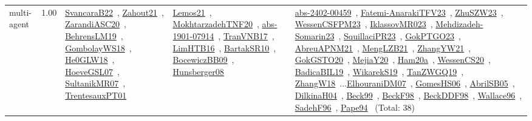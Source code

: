 {\begin{longtable}{p{3cm}r>{\raggedright\arraybackslash}p{6cm}>{\raggedright\arraybackslash}p{6cm}>{\raggedright\arraybackslash}p{8cm}}
\index{multi-agent}\index{Concepts!multi-agent}multi-agent &  1.00 & \href{../works/SvancaraB22.pdf}{SvancaraB22}~\cite{SvancaraB22}, \href{../works/Zahout21.pdf}{Zahout21}~\cite{Zahout21}, \href{../works/ZarandiASC20.pdf}{ZarandiASC20}~\cite{ZarandiASC20}, \href{../works/BehrensLM19.pdf}{BehrensLM19}~\cite{BehrensLM19}, \href{../works/GombolayWS18.pdf}{GombolayWS18}~\cite{GombolayWS18}, \href{../works/He0GLW18.pdf}{He0GLW18}~\cite{He0GLW18}, \href{../works/HoeveGSL07.pdf}{HoeveGSL07}~\cite{HoeveGSL07}, \href{../works/SultanikMR07.pdf}{SultanikMR07}~\cite{SultanikMR07}, \href{../works/TrentesauxPT01.pdf}{TrentesauxPT01}~\cite{TrentesauxPT01} & \href{../works/Lemos21.pdf}{Lemos21}~\cite{Lemos21}, \href{../works/MokhtarzadehTNF20.pdf}{MokhtarzadehTNF20}~\cite{MokhtarzadehTNF20}, \href{../works/abs-1901-07914.pdf}{abs-1901-07914}~\cite{abs-1901-07914}, \href{../works/TranVNB17.pdf}{TranVNB17}~\cite{TranVNB17}, \href{../works/LimHTB16.pdf}{LimHTB16}~\cite{LimHTB16}, \href{../works/BartakSR10.pdf}{BartakSR10}~\cite{BartakSR10}, \href{../works/BocewiczBB09.pdf}{BocewiczBB09}~\cite{BocewiczBB09}, \href{../works/Hunsberger08.pdf}{Hunsberger08}~\cite{Hunsberger08} & \href{../works/abs-2402-00459.pdf}{abs-2402-00459}~\cite{abs-2402-00459}, \href{../works/Fatemi-AnarakiTFV23.pdf}{Fatemi-AnarakiTFV23}~\cite{Fatemi-AnarakiTFV23}, \href{../works/ZhuSZW23.pdf}{ZhuSZW23}~\cite{ZhuSZW23}, \href{../works/WessenCSFPM23.pdf}{WessenCSFPM23}~\cite{WessenCSFPM23}, \href{../works/IklassovMR023.pdf}{IklassovMR023}~\cite{IklassovMR023}, \href{../works/Mehdizadeh-Somarin23.pdf}{Mehdizadeh-Somarin23}~\cite{Mehdizadeh-Somarin23}, \href{../works/SquillaciPR23.pdf}{SquillaciPR23}~\cite{SquillaciPR23}, \href{../works/GokPTGO23.pdf}{GokPTGO23}~\cite{GokPTGO23}, \href{../works/AbreuAPNM21.pdf}{AbreuAPNM21}~\cite{AbreuAPNM21}, \href{../works/MengLZB21.pdf}{MengLZB21}~\cite{MengLZB21}, \href{../works/ZhangYW21.pdf}{ZhangYW21}~\cite{ZhangYW21}, \href{../works/GokGSTO20.pdf}{GokGSTO20}~\cite{GokGSTO20}, \href{../works/MejiaY20.pdf}{MejiaY20}~\cite{MejiaY20}, \href{../works/Ham20a.pdf}{Ham20a}~\cite{Ham20a}, \href{../works/WessenCS20.pdf}{WessenCS20}~\cite{WessenCS20}, \href{../works/BadicaBIL19.pdf}{BadicaBIL19}~\cite{BadicaBIL19}, \href{../works/WikarekS19.pdf}{WikarekS19}~\cite{WikarekS19}, \href{../works/TanZWGQ19.pdf}{TanZWGQ19}~\cite{TanZWGQ19}, \href{../works/ZhangW18.pdf}{ZhangW18}~\cite{ZhangW18}...\href{../works/ElhouraniDM07.pdf}{ElhouraniDM07}~\cite{ElhouraniDM07}, \href{../works/GomesHS06.pdf}{GomesHS06}~\cite{GomesHS06}, \href{../works/AbrilSB05.pdf}{AbrilSB05}~\cite{AbrilSB05}, \href{../works/DilkinaH04.pdf}{DilkinaH04}~\cite{DilkinaH04}, \href{../works/Beck99.pdf}{Beck99}~\cite{Beck99}, \href{../works/BeckF98.pdf}{BeckF98}~\cite{BeckF98}, \href{../works/BeckDDF98.pdf}{BeckDDF98}~\cite{BeckDDF98}, \href{../works/Wallace96.pdf}{Wallace96}~\cite{Wallace96}, \href{../works/SadehF96.pdf}{SadehF96}~\cite{SadehF96}, \href{../works/Pape94.pdf}{Pape94}~\cite{Pape94} (Total: 38)\\

\end{longtable}}

